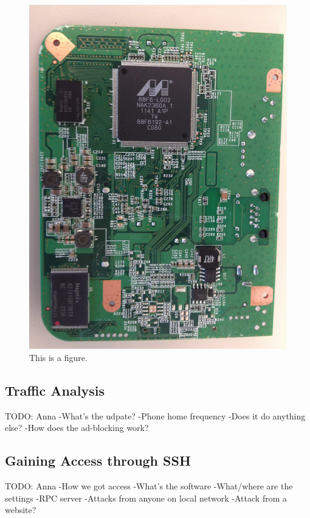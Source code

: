 \begin{figure}[htb]
\begin{center}
\includegraphics[width=\linewidth]{safeplug_bottom}
\caption{This is a figure.}
\end{center}
\end{figure}

\subsection{Traffic Analysis}
TODO: Anna
    -What's the udpate?
    -Phone home frequency
    -Does it do anything else?
    -How does the ad-blocking work?

\subsection{Gaining Access through SSH}
TODO: Anna
    -How we got access
    -What's the software
    -What/where are the settings
    -RPC server
        -Attacks from anyone on local network
        -Attack from a website?

